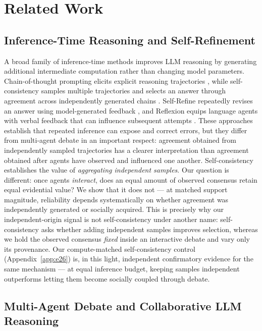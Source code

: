 \section{Related Work}
\label{sec:related_work}

\subsection{Inference-Time Reasoning and Self-Refinement}
\label{subsec:rw_reasoning}

A broad family of inference-time methods improves LLM reasoning by generating additional intermediate computation rather than changing model parameters. Chain-of-thought prompting elicits explicit reasoning trajectories \cite{wei2022cot}, while self-consistency samples multiple trajectories and selects an answer through agreement across independently generated chains \cite{wang2023selfconsistency}. Self-Refine repeatedly revises an answer using model-generated feedback \cite{madaan2023selfrefine}, and Reflexion equips language agents with verbal feedback that can influence subsequent attempts \cite{shinn2023reflexion}. These approaches establish that repeated inference can expose and correct errors, but they differ from multi-agent debate in an important respect: agreement obtained from independently sampled trajectories has a clearer interpretation than agreement obtained after agents have observed and influenced one another. Self-consistency establishes the value of \emph{aggregating independent samples}. Our question is different: once agents \emph{interact}, does an equal amount of observed consensus retain equal evidential value? We show that it does not --- at matched support magnitude, reliability depends systematically on whether agreement was independently generated or socially acquired. This is precisely why our independent-origin signal is not self-consistency under another name: self-consistency asks whether adding independent samples improves selection, whereas we hold the observed consensus \emph{fixed} inside an interactive debate and vary only its provenance. Our compute-matched self-consistency control (Appendix~\ref{app:e26}) is, in this light, independent confirmatory evidence for the same mechanism --- at equal inference budget, keeping samples independent outperforms letting them become socially coupled through debate.

\subsection{Multi-Agent Debate and Collaborative LLM Reasoning}
\label{subsec:rw_mad}

